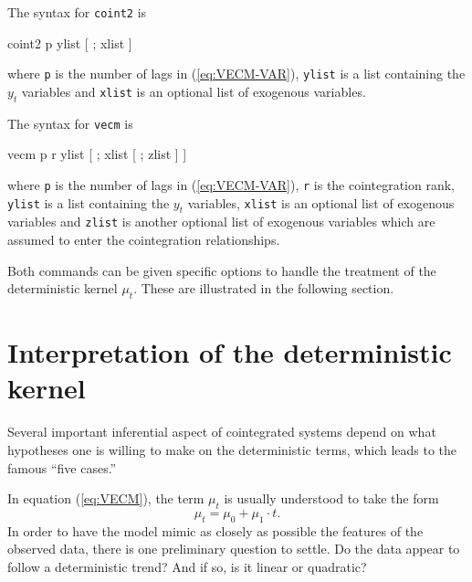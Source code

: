 The syntax for \texttt{coint2} is 
\begin{code}
  coint2 p ylist [ ; xlist ]
\end{code}
where \texttt{p} is the number of lags in (\ref{eq:VECM-VAR}),
\texttt{ylist} is a list containing the $y_t$ variables and
\texttt{xlist} is an optional list of exogenous variables.

The syntax for \texttt{vecm} is 
\begin{code}
  vecm p r ylist [ ; xlist [ ; zlist ] ]
\end{code}
where \texttt{p} is the number of lags in (\ref{eq:VECM-VAR}),
\texttt{r} is the cointegration rank, \texttt{ylist} is a list
containing the $y_t$ variables, \texttt{xlist} is an optional list of
exogenous variables and \texttt{zlist} is another optional list of
exogenous variables which are assumed to enter the cointegration
relationships.

Both commands can be given specific options to handle the treatment of
the deterministic kernel $\mu_t$. These are illustrated in the
following section.

\section{Interpretation of the deterministic kernel}
\label{sec:coint-5cases}

Several important inferential aspect of cointegrated systems depend on
what hypotheses one is willing to make on the deterministic terms,
which leads to the famous ``five cases.''

In equation (\ref{eq:VECM}), the term $\mu_t$ is usually understood to
take the form
\[
  \mu_t = \mu_0 + \mu_1 \cdot t .
\]
In order to have the model mimic as closely as possible the features
of the observed data, there is one preliminary question to settle. Do
the data appear to follow a deterministic trend? And if so, is it
linear or quadratic?

